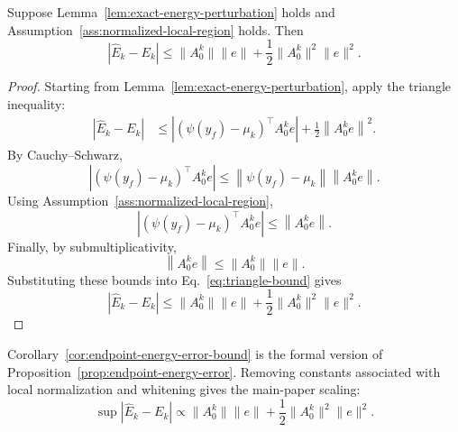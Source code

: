 \begin{corollary}
\label{cor:endpoint-energy-error-bound}
Suppose Lemma~\ref{lem:exact-energy-perturbation} holds and Assumption~\ref{ass:normalized-local-region} holds.
Then
\begin{equation}
    |\widehat{E}_k-E_k|
    \le
    \|A_0^k\|\|e\|
    +
    \frac{1}{2}
    \|A_0^k\|^2\|e\|^2 .
    \label{eq:energy-error-bound-appendix}
\end{equation}
\end{corollary}

\begin{proof}
Starting from Lemma~\ref{lem:exact-energy-perturbation}, apply the triangle inequality:
\begin{align}
    |\widehat{E}_k-E_k|
    &\le
    \left|
        \left(
            \psi(y_f)-\mu_k
        \right)^\top
        A_0^k e
    \right|
    +
    \frac{1}{2}
    \left\|
        A_0^k e
    \right\|^2 .
    \label{eq:triangle-bound}
\end{align}
By Cauchy--Schwarz,
\begin{equation}
    \left|
        \left(
            \psi(y_f)-\mu_k
        \right)^\top
        A_0^k e
    \right|
    \le
    \left\|
        \psi(y_f)-\mu_k
    \right\|
    \left\|
        A_0^k e
    \right\|.
\end{equation}
Using Assumption~\ref{ass:normalized-local-region},
\begin{equation}
    \left|
        \left(
            \psi(y_f)-\mu_k
        \right)^\top
        A_0^k e
    \right|
    \le
    \left\|
        A_0^k e
    \right\|.
\end{equation}
Finally, by submultiplicativity,
\begin{equation}
    \left\|
        A_0^k e
    \right\|
    \le
    \|A_0^k\|\|e\|.
\end{equation}
Substituting these bounds into Eq.~\eqref{eq:triangle-bound} gives
\begin{equation}
    |\widehat{E}_k-E_k|
    \le
    \|A_0^k\|\|e\|
    +
    \frac{1}{2}
    \|A_0^k\|^2\|e\|^2 .
\end{equation}
\end{proof}

Corollary~\ref{cor:endpoint-energy-error-bound} is the formal version of Proposition~\ref{prop:endpoint-energy-error}.
Removing constants associated with local normalization and whitening gives the main-paper scaling:
\[
    \sup |\widehat{E}_k-E_k|
    \propto
    \|A_0^k\|\|e\|
    +
    \frac{1}{2}
    \|A_0^k\|^2\|e\|^2 .
\]

